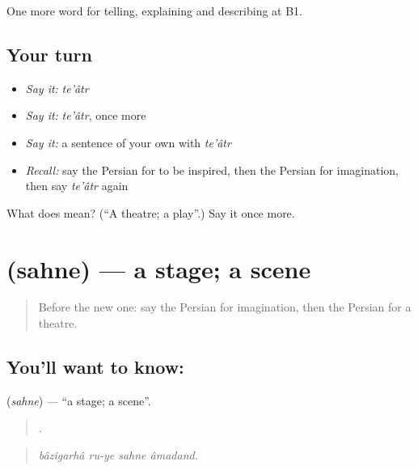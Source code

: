 \begin{grammarlens}[title={What you've built}]
One more word for telling, explaining and describing at B1.
\end{grammarlens}

\subsection*{Your turn}
\begin{itemize}
\raggedright
  \item \emph{Say it:} \emph{te'âtr}
  \item \emph{Say it:} \emph{te'âtr}, once more
  \item \emph{Say it:} a sentence of your own with \emph{te'âtr}
  \item \emph{Recall:} say the Persian for to be inspired, then the Persian for imagination, then say \emph{te'âtr} again
\end{itemize}

\begin{tcolorbox}[breakable,colback=teal!4,colframe=teal!35!black,title={Before you move on}]
What does  mean? (\textquotedblleft{}A theatre; a play\textquotedblright{}.) Say it once more.
\end{tcolorbox}
\section[\texorpdfstring{\fa{صحنه} (sahne)}{صحنه (sahne)}]{ (sahne) — a stage; a scene}

\label{lesson:FA-C523-sahne}



\begin{quote}
Before the new one: say the Persian for imagination, then the Persian for a theatre.
\end{quote}

\subsection*{You'll want to know: }
\textbf{} (\emph{sahne}) — \textquotedblleft{}a stage; a scene\textquotedblright{}.

\begin{quote}
   .
\end{quote}

\begin{quote}
\emph{bâzigarhâ ru-ye sahne âmadand.}
\end{quote}

